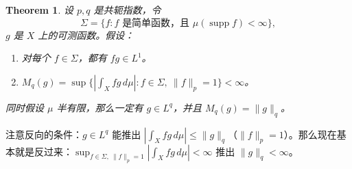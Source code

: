 \documentclass[12pt,letterpaper,twoside,openright]{ctexbook}
\theoremstyle{bluehead}
\newtheorem{theorem}{Theorem}
\theoremstyle{olivehead}
\theoremstyle{orangehead}
\theoremstyle{redremark}
\begin{document}
\begin{theorem}\label{thm:dual-simple-test}
设 $p,q$ 是共轭指数，令
\[
\Sigma=\{f:f\text{ 是简单函数，且 }\mu(\operatorname{supp}f)<\infty\},
\]
$g$ 是 $X$ 上的可测函数。假设：
\begin{enumerate}
\item[(1)] 对每个 $f\in\Sigma$，都有 $fg\in L^1$。
\item[(2)] $M_q(g)=\sup\{|\int_Xfg\,d\mu|:f\in\Sigma,\ \|f\|_p=1\}<\infty$。
\end{enumerate}
同时假设 $\mu$ 半有限，那么一定有 $g\in L^q$，并且 $M_q(g)=\|g\|_q$。
\end{theorem}

注意反向的条件：$g\in L^q$ 能推出 $|\int_Xfg\,d\mu|\leq\|g\|_q$（$\|f\|_p=1$）。那么现在基本就是反过来：$\sup_{f\in\Sigma,\ \|f\|_p=1}|\int_Xfg\,d\mu|<\infty$ 推出 $\|g\|_q<\infty$。
\end{document}
